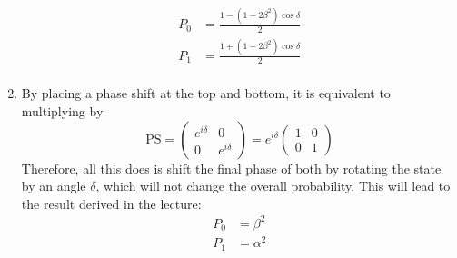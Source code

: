 \begin{sol}
\begin{enumerate}[label=\textbf{(\alph*)}]
\begin{align*}
    P_0 &= \frac{1-(1-2\beta^2)\cos\delta}{2} \\
    P_1 &= \frac{1+(1-2\beta^2)\cos\delta}{2} \\
\end{align*}
\item By placing a phase shift at the top and bottom, it is equivalent to multiplying by
$$\text{PS} = \begin{pmatrix}
e^{i\delta} & 0 \\
0 & e^{i\delta}
\end{pmatrix} = e^{i\delta} \begin{pmatrix}
1 & 0 \\
0 & 1
\end{pmatrix}
$$
Therefore, all this does is shift the final phase of both by rotating the state by an angle $\delta$, which will not change the overall probability. This will lead to the result derived in the lecture:
\begin{align*}
    P_0 &= \beta^2 \\
    P_1 &= \alpha^2 \\
\end{align*}
\end{enumerate}
\end{sol}